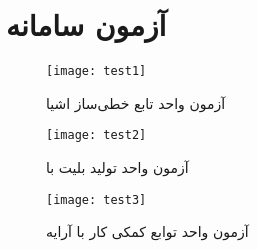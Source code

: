 \section{آزمون سامانه}

\begin{figure}[H]
	\centering
	\texttt{[image: test1]}
	\caption{آزمون واحد تابع خطی‌ساز اشیا}
	\label{fig:test1}
\end{figure}


\begin{figure}[H]
	\centering
	\texttt{[image: test2]}
	\caption{آزمون واحد تولید بلیت با }
	\label{fig:test2}
\end{figure}


\begin{figure}[H]
	\centering
	\texttt{[image: test3]}
	\caption{آزمون واحد توابع کمکی کار با آرایه }
	\label{fig:test3}
\end{figure}



